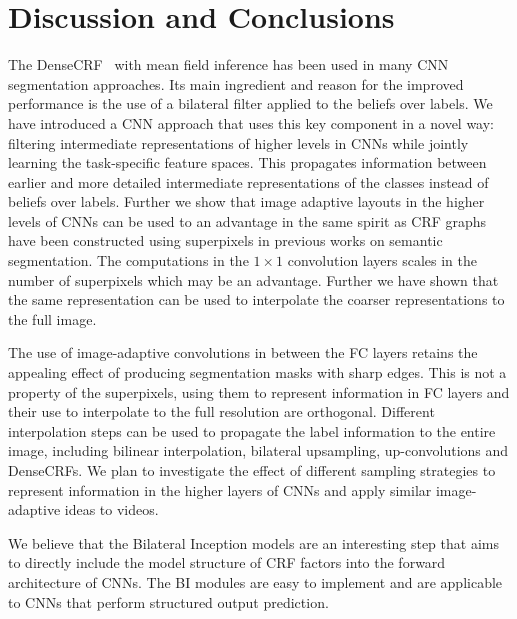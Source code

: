 \section{Discussion and Conclusions}
The DenseCRF~\cite{krahenbuhl2012efficient} with mean field inference has been used in many CNN segmentation approaches.
Its main ingredient and reason for the improved performance is the use of a bilateral filter applied to the beliefs over labels. We have introduced a CNN approach that uses this key component in a novel way: filtering intermediate representations of higher levels in CNNs while jointly learning the task-specific feature spaces.
This propagates information between earlier and more detailed intermediate representations of the classes instead of beliefs over labels.
Further we show that image adaptive layouts in the higher levels of CNNs can be used to an advantage in the same spirit as CRF graphs have been constructed using superpixels in previous works on semantic segmentation.
The computations in the $1\times1$ convolution layers scales in the number of superpixels which may be an advantage. Further we have shown that the same representation can be used to interpolate the coarser representations to the full image.

The use of image-adaptive convolutions in between the FC layers retains the appealing effect of producing segmentation masks with sharp edges.
This is not a property of the superpixels, using them to represent information in FC layers and their use to interpolate to the full resolution are orthogonal.
Different interpolation steps can be used to propagate the label information to the entire image, including bilinear interpolation, bilateral upsampling, up-convolutions and DenseCRFs.
We plan to investigate the effect of different sampling strategies to represent information in the higher layers of CNNs and apply similar image-adaptive ideas to videos.

We believe that the Bilateral Inception models are an interesting step that aims to directly include the model structure of CRF factors into the forward architecture of CNNs.
The BI modules are easy to implement and are applicable to CNNs that perform structured output prediction.
